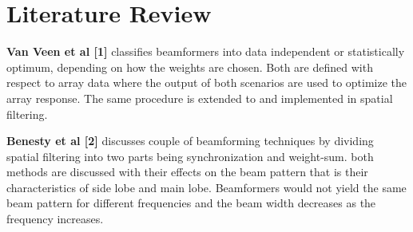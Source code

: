 \section[Literature Review]{\textbf{Literature Review}}

\textbf{Van Veen et al [1]} classifies beamformers into data independent or statistically optimum, depending on how the weights are chosen. Both are defined with respect to array data where the output of both scenarios are used to optimize the array response. The same procedure is extended to and implemented in spatial filtering.

\textbf{Benesty et al [2]} discusses couple of beamforming techniques by dividing spatial filtering into two parts being synchronization and weight-sum. both methods are discussed with their effects on the beam pattern that is their characteristics of side lobe and main lobe. Beamformers would not yield the same beam pattern for different frequencies and the beam width decreases as the frequency increases.

